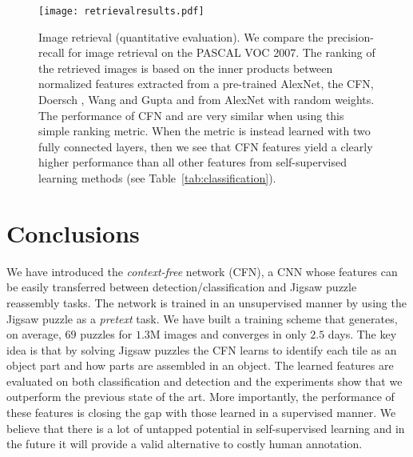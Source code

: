 \documentclass[runningheads]{llncs}
\begin{document}
\begin{figure}[t!]
\begin{center}
\texttt{[image: retrievalresults.pdf]}
\caption{Image retrieval (quantitative evaluation). We compare the precision-recall for image retrieval on the PASCAL VOC 2007. The ranking of the retrieved images is based on the inner products between normalized features extracted from a pre-trained AlexNet, the CFN, Doersch \etal \cite{Carl2015}, Wang and Gupta \cite{Gupta15} and from AlexNet with random weights. The performance of CFN and \cite{Carl2015} are very similar when using this simple ranking metric. When the metric is instead learned with two fully connected layers, then we see that CFN features yield a clearly higher performance than all other features from self-supervised learning methods (see Table~\ref{tab:classification}).} \label{fig:retrievalquanti}
\end{center}
\end{figure}

\clearpage
\section{Conclusions}

We have introduced the \emph{context-free} network (CFN), a CNN whose features can be easily transferred between detection/classification and Jigsaw puzzle reassembly tasks. The network is trained in an unsupervised manner by using the Jigsaw puzzle as a \emph{pretext} task. We have built a training scheme that generates, on average, $69$ puzzles for $1.3$M images and converges in only $2.5$ days. The key idea is that by solving Jigsaw puzzles the CFN learns to identify each tile as an object part and how parts are assembled in an object. The learned features are evaluated on both classification and detection and the experiments show that we outperform the previous state of the art. More importantly, the performance of these features is closing the gap with those learned in a supervised manner. We believe that there is a lot of untapped potential in self-supervised learning and in the future it will provide a valid alternative to costly human annotation.





\end{document}

